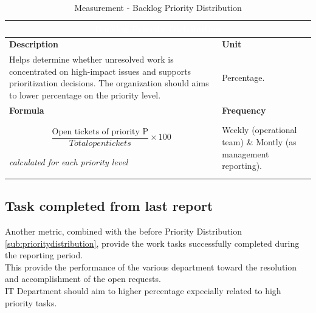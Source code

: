 \begin{table}[h]
    \centering
    \renewcommand{\arraystretch}{1.6}
    \setlength{\arrayrulewidth}{0.6pt}

    \begin{tabularx}{\textwidth}{|X|X|}
    \hline
    \multicolumn{2}{|c|}{\cellcolor{mcblue}\textcolor{white}{\textbf{Backlog Priority Distribution}}} \\ \hline

    \rowcolor{mclightgray}
    \textbf{Description} & \textbf{Unit} \\ \hline
    Helps determine whether unresolved work is concentrated on high-impact issues and supports prioritization decisions. The organization should aims to lower percentage on the priority level. &
    Percentage. \\ \hline

    \rowcolor{mclightgray}
    \textbf{Formula} & \textbf{Frequency} \\ \hline
    \[
     \frac{\text{Open tickets of priority P}}{Total open tickets} \times 100
    \]
    
    \textit{calculated for each priority level}
    
     &
    Weekly (operational team) \& Montly (as management reporting). \\ \hline

    \end{tabularx}

    \caption{Measurement - Backlog Priority Distribution}
    \label{tab:measurement_backlogPriorityDistribution}
\end{table}



\subsection{Task completed from last report}

Another metric, combined with the before Priority Distribution \ref{sub:prioritydistribution}, provide the work tasks successfully completed during the reporting period. \\
This provide the performance of the various department toward the resolution and accomplishment of the open requests. \\
IT Department should aim to higher percentage expecially related to high priority tasks.

